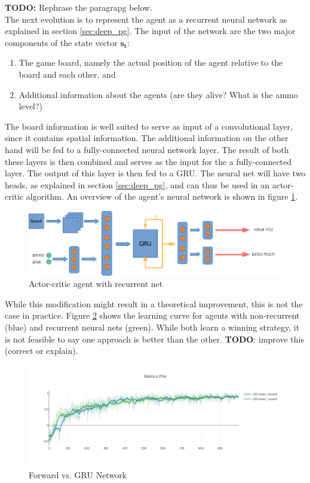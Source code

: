 \textbf{TODO:} Rephrase the paragrapg below.\\
The next evolution is to represent the agent as a recurrent neural network as explained in section \ref{sec:deep_pg}. The input of the network are the two major components of the state vector $\bm{s_t}$:
\begin{enumerate}
    \item The game board, namely the actual position of the agent relative to the board and each other, and
    \item Additional information about the agents (are they alive? What is the ammo level?)
\end{enumerate}
The board information is well suited to serve as input of a convolutional layer, since it contains spatial information. The additional information on the other hand will be fed to a fully-connected neural network layer. The result of both these layers is then combined and serves as the input for the a fully-connected layer. The output of this layer is then fed to a GRU. The neural net will have two heads, as explained in section \ref{sec:deep_pg}, and can thus be used in an actor-critic algorithm. An overview of the agent's neural network is shown in figure \ref{fig:agent_net}.
\begin{figure}[htp]
    \centering
    \includegraphics[width=16cm]{images/agent_net.png}
    \caption{Actor-critic agent with recurrent net}
    \label{fig:agent_net}
\end{figure}

While this modification might result in a theoretical improvement, this is not the case in practice. Figure \ref{fig:newplot194_195} shows the learning curve for agents with non-recurrent (blue) and recurrent neural nets (green). While both learn a winning strategy, it is not feasible to say one approach is better than the other. \textbf{TODO}: improve this (correct or explain).

\begin{figure}[htp]
    \centering
    \includegraphics[width=16cm]{images/experiment2/newplot194_195.png}
    \caption{Forward vs. GRU Network}
    \label{fig:newplot194_195}
\end{figure}

